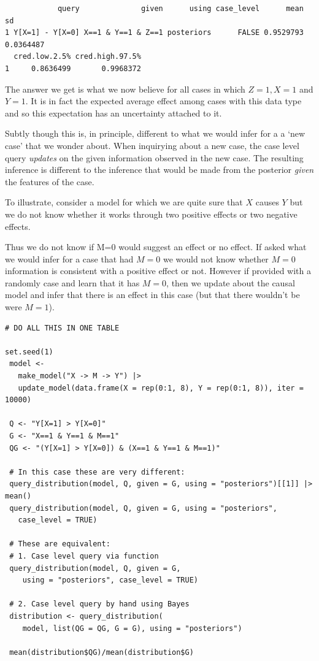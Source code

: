 \documentclass[
  article]{jss}
\begin{document}
\begin{verbatim}
            query              given      using case_level      mean        sd
1 Y[X=1] - Y[X=0] X==1 & Y==1 & Z==1 posteriors      FALSE 0.9529793 0.0364487
  cred.low.2.5% cred.high.97.5%
1     0.8636499       0.9968372
\end{verbatim}

The answer we get is what we now believe for all cases in which
\(Z=1, X=1\) and \(Y=1\). It is in fact the expected average effect
among cases with this data type and so this expectation has an
uncertainty attached to it.

Subtly though this is, in principle, different to what we would infer
for a a `new case' that we wonder about. When inquirying about a new
case, the case level query \emph{updates} on the given information
observed in the new case. The resulting inference is different to the
inference that would be made from the posterior \emph{given} the
features of the case.

To illustrate, consider a model for which we are quite sure that \(X\)
causes \(Y\) but we do not know whether it works through two positive
effects or two negative effects.

Thus we do not know if M=0 would suggest an effect or no effect. If
asked what we would infer for a case that had \(M=0\) we would not know
whether \(M=0\) information is consistent with a positive effect or not.
However if provided with a randomly case and learn that it has \(M=0\),
then we update about the causal model and infer that there is an effect
in this case (but that there wouldn't be were \(M=1\)).

\begin{verbatim}
# DO ALL THIS IN ONE TABLE

set.seed(1)
 model <-
   make_model("X -> M -> Y") |>
   update_model(data.frame(X = rep(0:1, 8), Y = rep(0:1, 8)), iter = 10000)

 Q <- "Y[X=1] > Y[X=0]"
 G <- "X==1 & Y==1 & M==1"
 QG <- "(Y[X=1] > Y[X=0]) & (X==1 & Y==1 & M==1)"

 # In this case these are very different:
 query_distribution(model, Q, given = G, using = "posteriors")[[1]] |> mean()
 query_distribution(model, Q, given = G, using = "posteriors",
   case_level = TRUE)

 # These are equivalent:
 # 1. Case level query via function
 query_distribution(model, Q, given = G,
    using = "posteriors", case_level = TRUE)

 # 2. Case level query by hand using Bayes
 distribution <- query_distribution(
    model, list(QG = QG, G = G), using = "posteriors")

 mean(distribution$QG)/mean(distribution$G)
\end{verbatim}
\end{document}
